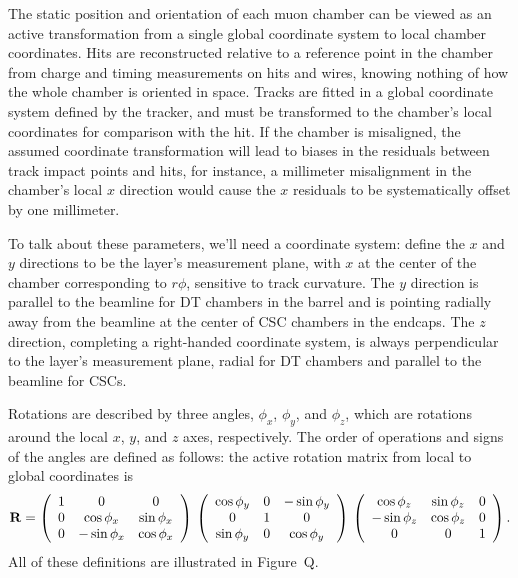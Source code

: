\documentclass[12pt]{article}
\begin{document}
The static position and orientation of each muon chamber can be viewed
as an active transformation from a single global coordinate system to
local chamber coordinates.  Hits are reconstructed relative to a
reference point in the chamber from charge and timing measurements on
hits and wires, knowing nothing of how the whole chamber is oriented
in space.  Tracks are fitted in a global coordinate system defined by
the tracker, and must be transformed to the chamber's local
coordinates for comparison with the hit.  If the chamber is
misaligned, the assumed coordinate transformation will lead to biases
in the residuals between track impact points and hits, for instance, a
millimeter misalignment in the chamber's local $x$ direction would
cause the $x$ residuals to be systematically offset by one millimeter.

To talk about these parameters, we'll need a coordinate system: define
the $x$ and $y$ directions to be the layer's measurement plane, with
$x$ at the center of the chamber corresponding to $r\phi$, sensitive
to track curvature.  The $y$ direction is parallel to the beamline for
DT chambers in the barrel and is pointing radially away from the
beamline at the center of CSC chambers in the endcaps.  The $z$
direction, completing a right-handed coordinate system, is always
perpendicular to the layer's measurement plane, radial for
DT chambers and parallel to the beamline for CSCs.

Rotations are described by three angles, $\phi_x$, $\phi_y$, and
$\phi_z$, which are rotations around the local $x$, $y$, and $z$ axes,
respectively.  The order of operations and signs of the angles are
defined as follows: the active rotation matrix from local to global
coordinates is
\begin{equation}
{\bf R} = \left(\begin{array}{c c c}
 1 &         0 &         0 \\
 0 &         \cos\phi_x &  \sin\phi_x \\
 0 &        -\sin\phi_x &  \cos\phi_x
\end{array}\right) \,
\left(\begin{array}{c c c}
 \cos\phi_y &  0 &        -\sin\phi_y \\
 0 &         1 &         0 \\
 \sin\phi_y &  0 &         \cos\phi_y
\end{array}\right) \,
\left(\begin{array}{c c c}
 \cos\phi_z &  \sin\phi_z &  0 \\
 -\sin\phi_z &  \cos\phi_z &  0 \\
 0 &         0 &         1
\end{array}\right) \mbox{.}
\end{equation}
All of these definitions are illustrated in Figure~Q.
\end{document}

